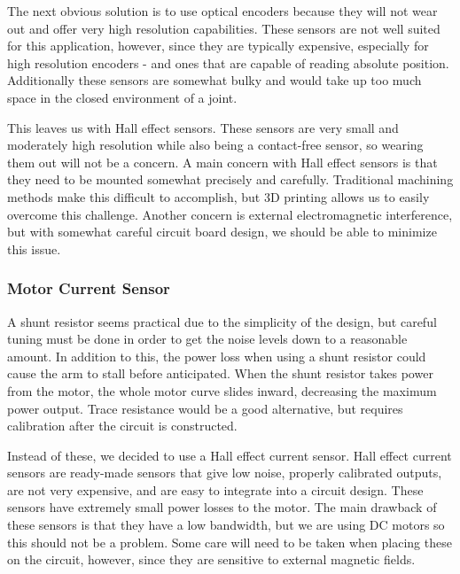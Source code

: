 \noindent The next obvious solution is to use optical encoders because they will not wear out and offer very high resolution capabilities. These sensors are not well suited for this application, however, since they are typically expensive, especially for high resolution encoders - and ones that are capable of reading absolute position. Additionally these sensors are somewhat bulky and would take up too much space in the closed environment of a joint. 

\noindent This leaves us with Hall effect sensors. These sensors are very small and moderately high resolution while also being a contact-free sensor, so wearing them out will not be a concern. A main concern with Hall effect sensors is that they need to be mounted somewhat precisely and carefully. Traditional machining methods make this difficult to accomplish, but 3D printing allows us to easily overcome this challenge.  Another concern is external electromagnetic interference, but with somewhat careful circuit board design, we should be able to minimize this issue.

\subsubsection{Motor Current Sensor}
A shunt resistor seems practical due to the simplicity of the design, but careful tuning must be done in order to get the noise levels down to a reasonable amount. In addition to this, the power loss when using a shunt resistor could cause the arm to stall before anticipated. When the shunt resistor takes power from the motor, the whole motor curve slides inward, decreasing the maximum power output. Trace resistance would be a good alternative, but requires calibration after the circuit is constructed. 

\noindent Instead of these, we decided to use a Hall effect current sensor. Hall effect current sensors are ready-made sensors that give low noise, properly calibrated outputs, are not very expensive, and are easy to integrate into a circuit design. These sensors have extremely small power losses to the motor. The main drawback of these sensors is that they have a low bandwidth, but we are using DC motors so this should not be a problem. Some care will need to be taken when placing these on the circuit, however, since they are sensitive to external magnetic fields.

